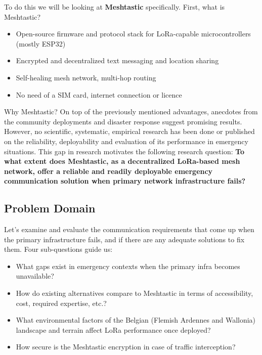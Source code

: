 To do this we will be looking at \textbf{Meshtastic} specifically.
First, what is Meshtastic?
\begin{itemize}
  \item Open-source firmware and protocol stack for LoRa-capable microcontrollers (mostly ESP32)
  \item Encrypted and decentralized text messaging and location sharing
  \item Self-healing mesh network, multi-hop routing
  \item No need of a SIM card, internet connection or licence
\end{itemize}
Why Meshtastic? On top of the previously mentioned advantages, anecdotes from the community deployments and disaster
response suggest promising results. However, no scientific, systematic, empirical research has been done or published on the
reliability, deployability and evaluation of its performance in emergency situations.
This gap in research motivates the following research question:
\textbf{To what extent does Meshtastic, as a decentralized LoRa-based mesh network, offer a reliable and readily
deployable emergency communication solution when primary network infrastructure fails?}

\subsection{Problem Domain}%
\label{subsec:problem-domain}
Let's examine and evaluate the communication requirements that come up when the primary infrastructure fails, and if there are any adequate solutions to fix them.
Four sub-questions guide us:
\begin{itemize}
  \item What gaps exist in emergency contexts when the primary infra becomes unavailable?
  \item How do existing alternatives compare to Meshtastic in terms of accessibility, cost, required expertise, etc.?
  \item What environmental factors of the Belgian (Flemish Ardennes and Wallonia) landscape and terrain affect LoRa performance once deployed?
  \item How secure is the Meshtastic encryption in case of traffic interception?
\end{itemize}

